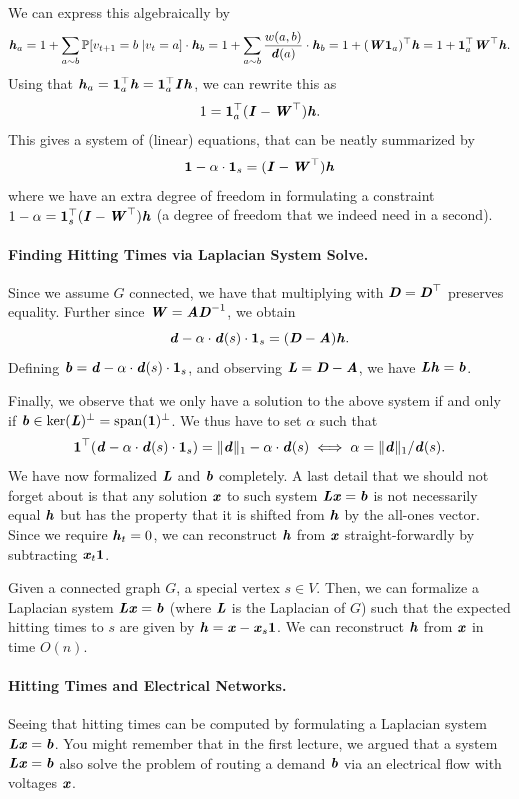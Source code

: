 We can express this algebraically by
\[
\hh_a = 1 + \sum_{a \sim b} \mathbb{P}[v_{t+1} = b \;| v_t = a]  \cdot \hh_b = 1 + \sum_{a \sim b} \frac{w(a,b)}{\dd(a)}  \cdot \hh_b =  1 + (\WW\vecone_a)^{\trp} \hh = 1 + \vecone_a^{\trp} \WW^{\trp} \hh.
\]
Using that $\hh_a = \vecone_a^{\trp} \hh =  \vecone_a^{\trp} \II \hh$, we can rewrite this as 
\[
1 = \vecone_a^\trp (\II - \WW^\trp) \hh.
\]
This gives a system of (linear) equations, that can be neatly summarized by 
\[
\vecone - \alpha \cdot \vecone_s = (\II - \WW^\trp) \hh
\]
where we have an extra degree of freedom in formulating a constraint $1 - \alpha = \vecone_s^\trp (\II -\WW^\trp) \hh$ (a degree of freedom that we indeed need in a second).

\paragraph{Finding Hitting Times via Laplacian System Solve.} Since we assume $G$ connected, we have that multiplying with $\DD = \DD^\trp$ preserves equality. Further since $\WW = \AA \DD^{-1}$, we obtain
\[
\dd - \alpha \cdot \dd(s) \cdot \vecone_s = (\DD - \AA) \hh.
\]
Defining $\bb = \dd - \alpha \cdot \dd(s) \cdot \vecone_s$, and observing $\LL = \DD - \AA$, we have $\LL\hh = \bb$. 

Finally, we observe that we only have a solution to the above system if and only if $\bb \in \ker(\LL)^\perp =  \Span(\vecone)^\perp$. We thus have to set $\alpha$ such that 
\[
\vecone^{\trp}(\dd - \alpha \cdot \dd(s) \cdot \vecone_s) = \|\dd\|_1 - \alpha \cdot \dd(s) \iff \alpha =  \|\dd\|_1 /\dd(s).
\]
We have now formalized $\LL$ and $\bb$ completely. A last detail that we should not forget about is that any solution $\xx$ to such system $\LL \xx = \bb$ is not necessarily equal $\hh$ but has the property that it is shifted from $\hh$ by the all-ones vector. Since we require $\hh_t = 0$, we can reconstruct $\hh$ from $\xx$ straight-forwardly by subtracting $\xx_t \vecone$.

\begin{theorem}
	Given a connected graph $G$, a special vertex $s \in V$. Then, we can formalize a Laplacian system $\LL \xx = \bb$ (where $\LL$ is the Laplacian of $G$) such that the expected hitting times to $s$ are given by $\hh = \xx - \xx_s \vecone$. We can reconstruct $\hh$ from $\xx$ in time $O(n)$.
\end{theorem}

\paragraph{Hitting Times and Electrical Networks.} Seeing that hitting times can be computed by formulating a Laplacian system $\LL \xx = \bb$. You might remember that in the first lecture, we argued that a system $\LL \xx = \bb$ also solve the problem of routing a demand $\bb$ via an electrical flow with voltages $\xx$. 

